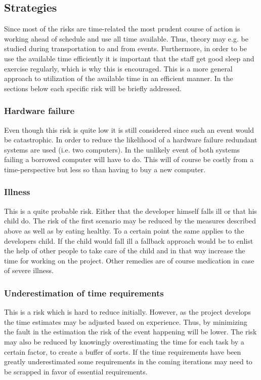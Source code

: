 \documentclass[12pt, letterpaper]{article}
\begin{document}
\subsection{Strategies}
Since most of the risks are time-related the most prudent course of action is working ahead of schedule and use all time available. Thus, theory may e.g. be studied during transportation to and from events. Furthermore, in order to be use the available time efficiently it is important that the staff get good sleep and exercise regularly, which is why this is encouraged. This is a more general approach to utilization of the available time in an efficient manner. In the sections below each specific risk will be briefly addressed.
\subsubsection{Hardware failure}
Even though this risk is quite low it is still considered since such an event would be catastrophic. In order to reduce the likelihood of a hardware failure redundant systems are used (i.e. two computers). In the unlikely event of both systems failing a borrowed computer will have to do. This will of course be costly from a time-perspective but less so than having to buy a new computer.
\subsubsection{Illness}
This is a quite probable risk. Either that the developer himself falls ill or that his child do. The risk of the first scenario may be reduced by the measures described above as well as by eating healthy. To a certain point the same applies to the developers child. If the child would fall ill a fallback approach would be to enlist the help of other people to take care of the child and in that way increase the time for working on the project. Other remedies are of course medication in case of severe illness.
\subsubsection{Underestimation of time requirements}
This is a risk which is hard to reduce initially. However, as the project develops the time estimates may be adjusted based on experience. Thus, by minimizing the fault in the estimation the risk of the event happening will be lower. The risk may also be reduced by knowingly overestimating the time for each task by a certain factor, to create a buffer of sorts. If the time requirements have been greatly underestimated some requirements in the coming iterations may need to be scrapped in favor of essential requirements.
\end{document}
